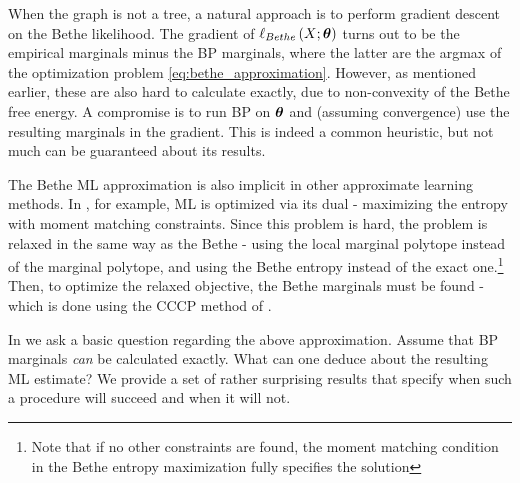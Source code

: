 When the graph is not a tree, a natural approach is to perform gradient descent on the Bethe likelihood.
The gradient of $\ell_{Bethe}\left(X;\boldsymbol{\theta}\right)$ turns out to be the empirical marginals minus the BP marginals, where the  latter are the argmax of the optimization problem  \eqref{eq:bethe_approximation}.
However, as mentioned earlier, these are also hard to calculate exactly, due to non-convexity of the Bethe free energy.
A compromise is to run BP on $\boldsymbol{\theta}$ and (assuming convergence) use the resulting marginals in the gradient.
This is indeed a common heuristic, but not much can be guaranteed about its results.

The Bethe ML approximation is also implicit in other approximate learning methods.
In \cite{ganapathi2012constrained}, for example, ML is optimized via its dual - maximizing the entropy with moment matching constraints.
Since this problem is hard, the problem is relaxed in the same way as the Bethe - using the local marginal polytope instead of the marginal polytope, and using the Bethe entropy instead of the exact one.\footnote{Note that if no other constraints are found, the moment matching condition in the Bethe entropy maximization fully specifies the solution}
Then, to optimize the relaxed objective, the Bethe marginals must be found - which is done using the CCCP method of \cite{yuille2002cccp}.


In \cite{heinemann2012cannot} we ask a basic question regarding the above approximation. Assume that BP marginals {\em can} be calculated exactly. What can one deduce about the resulting ML estimate? We provide a set of rather surprising results that specify when such a procedure will succeed and when it will not.

